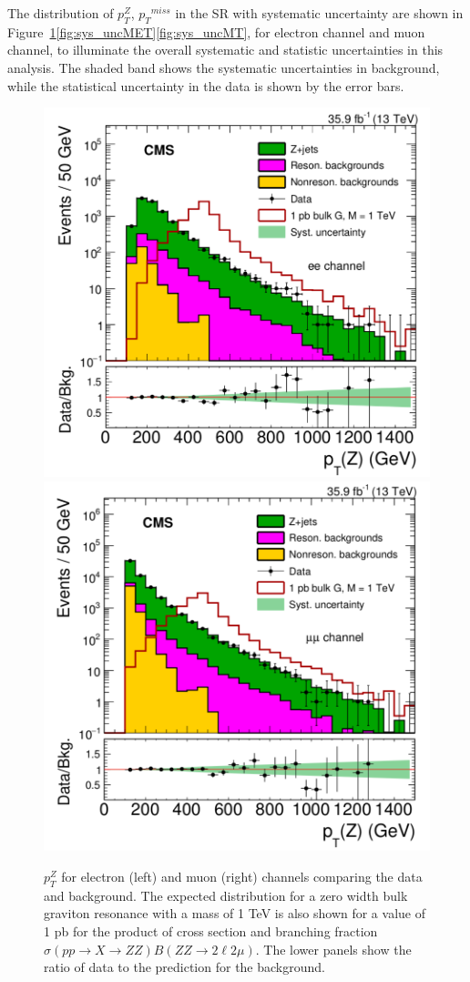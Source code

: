 \vspace{0.3cm}
The distribution of $p_T ^Z$, ${p_{T}}^{miss}$ in the SR with systematic uncertainty are shown in Figure~\ref{fig:sys_uncZpt}\ref{fig:sys_uncMET}\ref{fig:sys_uncMT}, for electron channel and muon channel, to illuminate the overall systematic and statistic uncertainties in this analysis. The shaded band shows the systematic uncertainties in background, while the statistical uncertainty in the data is shown by the error bars.
\begin{figure}[htbp]
\begin{center}
\includegraphics[width=0.49\linewidth]{figures/sys_elSRuncZpt.png}
\includegraphics[width=0.49\linewidth]{figures/sys_muSRuncZpt.png}
\caption{$p_T ^Z$ for electron (left) and muon (right) channels comparing the data and background. The expected distribution for a zero width bulk graviton resonance with a mass of 1 TeV is also shown for a value of 1 pb for the product of cross section and branching fraction $\sigma(pp\rightarrow X\rightarrow ZZ)B(ZZ\rightarrow 2\ell 2\mu)$. The lower panels show the ratio of data to the prediction for the background. }
\label{fig:sys_uncZpt}
\end{center}
\end{figure}

